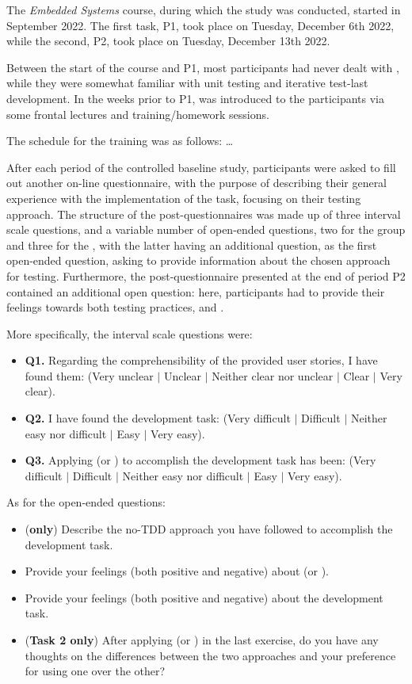 The \textit{Embedded Systems} course, during which the study was conducted, started in September 2022. The first task, P1, took place on Tuesday, December 6th 2022, while the second, P2, took place on Tuesday, December 13th 2022.

Between the start of the course and P1, most participants had never dealt with \tdd, while they were somewhat familiar with unit testing and iterative test-last development. 
In the weeks prior to P1, \tdd was introduced to the participants via some frontal lectures and training/homework sessions.

The schedule for the training was as follows:
\dots

After each period of the controlled baseline study, participants were asked to fill out another on-line questionnaire, with the purpose of describing their general experience with the implementation of the task, focusing on their testing approach. 
The structure of the post-questionnaires was made up of three interval scale questions, and a variable number of open-ended questions, two for the \tdd group and three for the \notdd, with the latter having an additional question, as the first open-ended question, asking to provide information about the chosen approach for testing. Furthermore, the post-questionnaire presented at the end of period P2 contained an additional open question: here, participants had to provide their feelings towards both testing practices, \tdd and \notdd. 

More specifically, the interval scale questions were:
\begin{itemize}
    \item \textbf{Q1.} Regarding the comprehensibility of the provided user stories, I have found them: (Very unclear $|$ Unclear $|$ Neither clear nor unclear $|$ Clear $|$ Very clear).
    \item \textbf{Q2.} I have found the development task: (Very difficult $|$ Difficult $|$ Neither easy nor difficult $|$ Easy $|$ Very easy).
    \item \textbf{Q3.} Applying (\ie \tdd or \notdd) to accomplish the development task has been: (Very difficult $|$ Difficult $|$ Neither easy nor difficult $|$ Easy $|$ Very easy).
\end{itemize}

\noindent As for the open-ended questions:
\begin{itemize}
    \item (\textbf{\notdd only}) Describe the no-TDD approach you have followed to accomplish the development task.
    \item Provide your feelings (both positive and negative) about (\ie \tdd or \notdd).
    \item Provide your feelings (both positive and negative) about the development task.
    \item (\textbf{Task 2 only}) After applying (\ie \tdd or \notdd) in the last exercise, do you have any thoughts on the differences between the two approaches and your preference for using one over the other?
\end{itemize}

